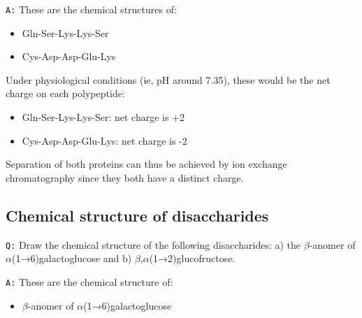 \documentclass[11pt, a4paper,titlepage]{article}
\begin{document}
\texttt{A:} These are the chemical structures of:
\begin{itemize}
\item Gln-Ser-Lys-Lys-Ser

  \setatomsep{25pt}
\item Cys-Asp-Asp-Glu-Lys

  \setatomsep{25pt}
\end{itemize}

Under physiological conditions (ie, pH around 7.35), these would be
the net charge on each polypeptide:

\begin{itemize}
\item Gln-Ser-Lys-Lys-Ser: net charge is +2

\item Cys-Asp-Asp-Glu-Lys: net charge is -2

\end{itemize}

Separation of both proteins can thus be achieved by ion exchange
chromatography since they both have a distinct charge.
\subsection{Chemical structure of disaccharides}
\label{sec-2-3}

\texttt{Q:} Draw the chemical structure of the following disaccharides: a)
the $\beta$-anomer of $\alpha$(1→6)galactoglucose and b)
$\beta$,$\alpha$(1→2)glucofructose.

\texttt{A:} These are the chemical structure of:
\begin{itemize}
\item $\beta$-anomer of $\alpha$(1→6)galactoglucose
\end{itemize}
\end{document}
